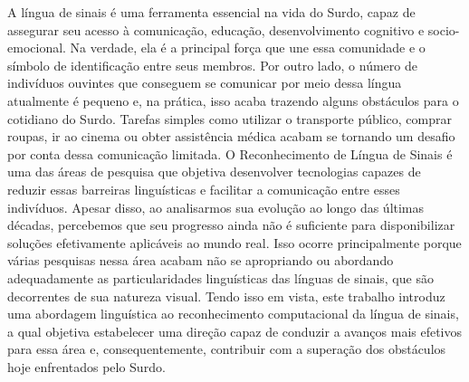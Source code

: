 \begin{resumo}[Resumo]
  \noindent
  A língua de sinais é uma ferramenta essencial na vida do Surdo, capaz de assegurar seu acesso à comunicação, educação, desenvolvimento cognitivo e socio-emocional.
  Na verdade, ela é a principal força que une essa comunidade e o símbolo de identificação entre seus membros.
  Por outro lado, o número de indivíduos ouvintes que conseguem se comunicar por meio dessa língua atualmente é pequeno e, na prática, isso acaba trazendo alguns obstáculos para o cotidiano do Surdo.
  Tarefas simples como utilizar o transporte público, comprar roupas, ir ao cinema ou obter assistência médica acabam se tornando um desafio por conta dessa comunicação limitada.
  O Reconhecimento de Língua de Sinais é uma das áreas de pesquisa que objetiva desenvolver tecnologias capazes de reduzir essas barreiras linguísticas e facilitar a comunicação entre esses indivíduos.
  Apesar disso, ao analisarmos sua evolução ao longo das últimas décadas, percebemos que seu progresso ainda não é suficiente para disponibilizar soluções efetivamente aplicáveis ao mundo real.
  Isso ocorre principalmente porque várias pesquisas nessa área acabam não se apropriando ou abordando adequadamente as particularidades linguísticas das línguas de sinais, que são decorrentes de sua natureza visual.
  Tendo isso em vista, este trabalho introduz uma abordagem linguística ao reconhecimento computacional da língua de sinais, a qual objetiva estabelecer uma direção capaz de conduzir a avanços mais efetivos para essa área e, consequentemente, contribuir com a superação dos obstáculos hoje enfrentados pelo Surdo.




\end{resumo}
